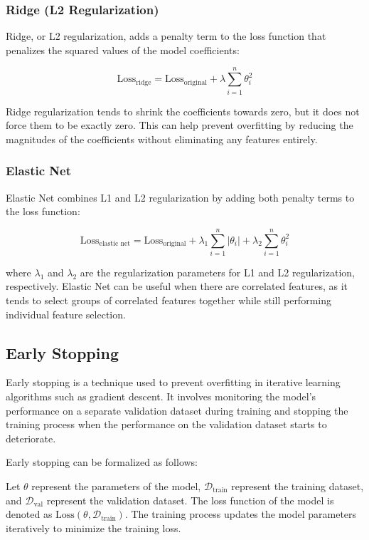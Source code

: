 \documentclass[12pt]{book} %
\begin{document}
\subsubsection{Ridge (L2 Regularization)}

Ridge, or L2 regularization, adds a penalty term to the loss function that penalizes the squared values of the model coefficients:

\[
\text{Loss}_{\text{ridge}} = \text{Loss}_{\text{original}} + \lambda \sum_{i=1}^{n} \theta_i^2
\]

Ridge regularization tends to shrink the coefficients towards zero, but it does not force them to be exactly zero. This can help prevent overfitting by reducing the magnitudes of the coefficients without eliminating any features entirely.

\subsubsection{Elastic Net}

Elastic Net combines L1 and L2 regularization by adding both penalty terms to the loss function:

\[
\text{Loss}_{\text{elastic net}} = \text{Loss}_{\text{original}} + \lambda_1 \sum_{i=1}^{n} |\theta_i| + \lambda_2 \sum_{i=1}^{n} \theta_i^2
\]

where \( \lambda_1 \) and \( \lambda_2 \) are the regularization parameters for L1 and L2 regularization, respectively. Elastic Net can be useful when there are correlated features, as it tends to select groups of correlated features together while still performing individual feature selection.

\subsection{Early Stopping}

Early stopping is a technique used to prevent overfitting in iterative learning algorithms such as gradient descent. It involves monitoring the model's performance on a separate validation dataset during training and stopping the training process when the performance on the validation dataset starts to deteriorate.

Early stopping can be formalized as follows:

Let \( \theta \) represent the parameters of the model, \( \mathcal{D}_{\text{train}} \) represent the training dataset, and \( \mathcal{D}_{\text{val}} \) represent the validation dataset. The loss function of the model is denoted as \( \text{Loss}(\theta, \mathcal{D}_{\text{train}}) \). The training process updates the model parameters iteratively to minimize the training loss.
\end{document}
